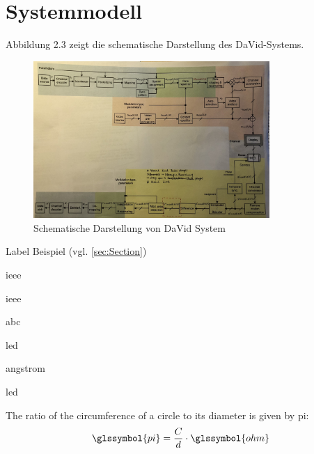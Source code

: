 












\section{Systemmodell} 

Abbildung 2.3 zeigt die schematische Darstellung des DaVid-Systems. 


\begin{figure}[htb]
 \centering 
 \includegraphics[keepaspectratio,width=0.8\textwidth]{images/David3.jpg}
 \caption{Schematische Darstellung von DaVid System}
 \label{fig:David1}
\end{figure}


















Label Beispiel (vgl. \cref{sec:Section})

\cite{Kammeyer}

\gls{ieee}

\gls{ieee}

\gls{abc}

\gls{led}

 \gls{angstrom}

\gls{led}

The ratio of the circumference of a circle to its diameter is given by \gls{pi}:
\begin{equation}
\glssymbol{pi} = \frac{C}{d} \cdot \glssymbol{ohm}
\end{equation}

